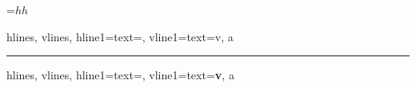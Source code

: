 \documentclass{article}
\begin{document}
=\hbox{$h$\small$h$}

\START

  \begin{tblr}{
    hlines,
    vlines,
    hline{1}={text={}},
    vline{1}={text={v}},
  }
    a
  \end{tblr}
\ENDTEST

\bigskip\hrule\bigskip

  \begin{tblr}{
    hlines,
    vlines,
    hline{1}={text={\def\x{}\small{}}},
    vline{1}={text={\textbf{v}}},
  }
    a
  \end{tblr}
\ENDTEST
\end{document}
